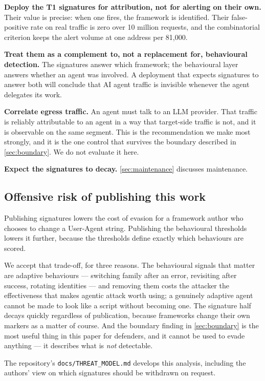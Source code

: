 \documentclass[11pt]{article}
\begin{document}
\textbf{Deploy the T1 signatures for attribution, not for alerting on their own.} Their value
is precise: when one fires, the framework is identified. Their false-positive rate on real
traffic is zero over 10 million requests, and the combinatorial criterion keeps the alert
volume at one address per 81,000.

\textbf{Treat them as a complement to, not a replacement for, behavioural detection.} The
signatures answer which framework; the behavioural layer answers whether an agent was
involved. A deployment that expects signatures to answer both will conclude that AI agent
traffic is invisible whenever the agent delegates its work.

\textbf{Correlate egress traffic.} An agent must talk to an LLM provider. That traffic is
reliably attributable to an agent in a way that target-side traffic is not, and it is observable
on the same segment. This is the recommendation we make most strongly, and it is the one
control that survives the boundary described in \ref{sec:boundary}. We do not evaluate it here.

\textbf{Expect the signatures to decay.} \ref{sec:maintenance} discusses maintenance.

\subsection{Offensive risk of publishing this work}
\label{sec:egress}

Publishing signatures lowers the cost of evasion for a framework author who chooses to change
a User-Agent string. Publishing the behavioural thresholds lowers it further, because the
thresholds define exactly which behaviours are scored.

We accept that trade-off, for three reasons. The behavioural signals that matter are adaptive
behaviours --- switching family after an error, revisiting after success, rotating identities
--- and removing them costs the attacker the effectiveness that makes agentic attack worth
using; a genuinely adaptive agent cannot be made to look like a script without becoming one.
The signature half decays quickly regardless of publication, because frameworks change their
own markers as a matter of course. And the boundary finding in \ref{sec:boundary} is the most
useful thing in this paper for defenders, and it cannot be used to evade anything --- it
describes what is \emph{not} detectable.

The repository's \texttt{docs/THREAT\_MODEL.md} develops this analysis, including the
authors' view on which signatures should be withdrawn on request.
\end{document}

